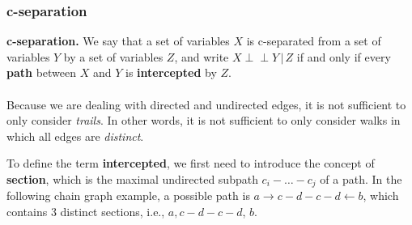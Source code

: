 \documentclass{article}
\newcommand{\indep}{\perp \!\!\! \perp}
\begin{document}
\subsubsection{c-separation}

\begin{theorem}
    \textbf{c-separation.} We say that a set of variables $X$ is c-separated from a set of variables $Y$ by a set of variables $Z$, and write $X \indep Y \,|\, Z$ if and only if every \textbf{path} between $X$ and $Y$ is \textbf{intercepted} by $Z$. 
    \\
    \\
    Because we are dealing with directed and undirected edges, it is not sufficient to only consider \textit{trails}. In other words, it is not sufficient to only consider walks in which all edges are \textit{distinct}. 
\end{theorem}

\noindent To define the term \textbf{intercepted}, we first need to introduce the concept of \textbf{section}, which is the maximal undirected subpath $c_i - \dots - c_j$ of a path. In the following chain graph example, a possible path is $a \rightarrow c - d - c - d \leftarrow b$, which contains 3 distinct sections, i.e., $a, c - d - c - d$, $b$.

\begin{center}
\end{center}
\end{document}
